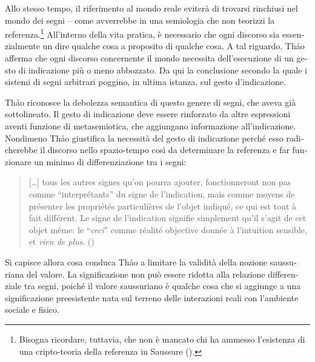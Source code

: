 \documentclass[output=paper]{../langscibook}
\begin{document}
\begin{otherlanguage}{italian}
Allo stesso tempo, il riferimento al mondo reale eviterà di trovarsi rinchiusi nel mondo dei segni – come avverrebbe in una semiologia che non teorizzi la referenza.\footnote{{Bisogna ricordare, tuttavia, che non è mancato chi ha ammesso l’esistenza di una cripto-teoria della referenza in Saussure (\citealt{arrive_quen_2007,bouquet_semiologie_1992}).}} All’interno della vita pratica, è necessario che ogni discorso sia essenzialmente un dire qualche cosa a proposito di qualche cosa. A tal riguardo, Th\textlatin{ả}o afferma che ogni discorso concernente il mondo necessita dell’esecuzione di un gesto di indicazione più o meno abbozzato. Da qui la conclusione secondo la quale i sistemi di segni arbitrari poggino, in ultima istanza, sul gesto d’indicazione.

Th\textlatin{ả}o riconosce la debolezza semantica di questo genere di segni, che \citet[48]{eco_semiotica_1984} aveva già sottolineato. Il gesto di indicazione deve essere rinforzato da altre espressioni aventi funzione di metasemiotica, che aggiungano informazione all’indicazione. Nondimeno Th\textlatin{ả}o giustifica la necessità del gesto di indicazione perché esso radicherebbe il discorso nello spazio-tempo così da determinare la referenza e far funzionare un minimo di differenziazione tra i segni:

\begin{quote}
[…] tous les autres signes qu’on pourra ajouter, fonctionneront non pas comme “interprétants” du signe de l’indication, mais comme moyens de présenter les propriétés particulières de l’objet indiqué, ce qui est tout à fait différent. Le signe de l’indication signifie simplement qu’il s’agit de cet objet même: le “\textit{ceci}” comme réalité objective donnée à l’intuition sensible, et \textit{rien de plus}. (\citealt[62]{thao_recherches_1973})
\end{quote}

Si capisce allora cosa conduca Th\textlatin{ả}o a limitare la validità della nozione saussuriana del valore. La significazione non può essere ridotta alla relazione differenziale tra segni, poiché il valore saussuriano è qualche cosa che si aggiunge a una significazione preesistente nata sul terreno delle interazioni reali con l’ambiente sociale e fisico.


\end{otherlanguage}
\end{document}
